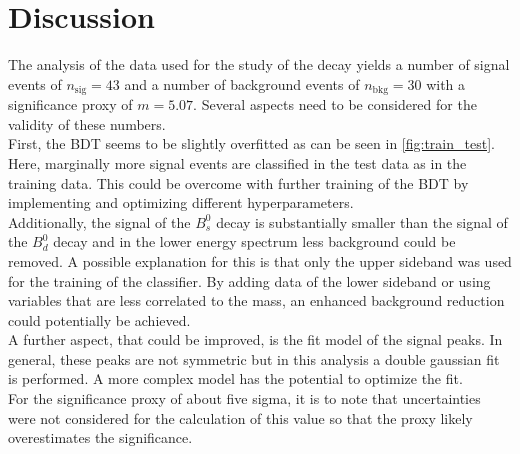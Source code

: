 \section{Discussion}
\label{sec:Discussion}
The analysis of the data used for the study of the decay \printBstoPsiKs \: yields a number of signal events of $n_\text{sig} = \num{43}$ and a number of background events of $n_\text{bkg} = \num{30}$
with a significance proxy of $m = \num{5.07}$. Several aspects need to be considered for the validity of these numbers. \\
First, the BDT seems to be slightly overfitted as can be seen in \autoref{fig:train_test}. Here, marginally more signal events are classified in the test data as in the training data.
This could be overcome with further training of the BDT by implementing and optimizing different hyperparameters. \\
Additionally, the signal of the $B^0_s$ decay is substantially smaller than the signal of the $B^0_d$ decay and in the lower energy spectrum less background could be removed. A possible explanation
for this is that only the upper sideband was used for the training of the classifier. By adding data of the lower sideband or using variables that are less correlated to the mass, an enhanced background reduction
could potentially be achieved. \\
A further aspect, that could be improved, is the fit model of the signal peaks. In general, these peaks are not symmetric but in this analysis a double gaussian fit is performed. A more complex model has 
the potential to optimize the fit. \\
For the significance proxy of about five sigma, it is to note that uncertainties were not considered for the calculation of this value so that the proxy likely overestimates the significance.

%
%
